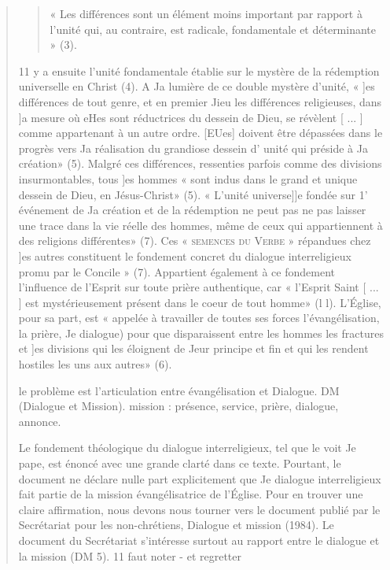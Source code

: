 \begin{quote}
\begin{quote}
« Les différences
sont un élément moins important par rapport à l'unité
qui, au contraire, est radicale, fondamentale et déterminante »
(3). 
\end{quote}
 11 y a ensuite l'unité fondamentale établie sur le mystère
de la rédemption universelle en Christ (4). A Ja lumière de ce
double mystère d'unité, « ]es différences de tout genre, et en
premier Jieu les différences religieuses, dans ]a mesure où eHes
sont réductrices du dessein de Dieu, se révèlent [ ... ] comme
appartenant à un autre ordre. [EUes] doivent être dépassées
dans le progrès vers Ja réalisation du grandiose dessein d' unité
qui préside à Ja création» (5). Malgré ces différences, ressenties
parfois comme des divisions insurmontables, tous ]es
hommes « sont indus dans le grand et unique dessein de Dieu,
en Jésus-Christ» (5). « L'unité universe]]e fondée sur 1' événement
de Ja création et de la rédemption ne peut pas ne pas laisser
une trace dans la vie réelle des hommes, même de ceux qui
appartiennent à des religions différentes» (7). Ces \textsc{« semences
du Verbe »} \label{LogoiSpermatikoi} répandues chez ]es autres constituent le fondement
concret du dialogue interreligieux promu par le Concile » (7).
Appartient également à ce fondement l'influence de l'Esprit
sur toute prière authentique, car « l'Esprit Saint [ ... ] est mystérieusement
présent dans le coeur de tout homme» (l l). L'Église,
pour sa part, est « appelée à travailler de toutes ses forces
l'évangélisation, la prière, Je dialogue) pour que disparaissent
entre les hommes les fractures et ]es divisions qui les éloignent
de Jeur principe et fin et qui les rendent hostiles les uns aux
autres» (6).
\begin{Synthesis}
le problème est l'articulation entre évangélisation et Dialogue. DM (Dialogue et Mission).
mission : présence, service, prière, dialogue, annonce.
\end{Synthesis}
Le fondement théologique du dialogue interreligieux, tel
que le voit Je pape, est énoncé avec une grande clarté dans ce
texte. Pourtant, le document ne déclare nulle part explicitement
que Je dialogue interreligieux fait partie de la mission
évangélisatrice de l'Église.  
Pour en trouver une claire affirmation,
nous devons nous tourner vers le document publié par
le Secrétariat pour les non-chrétiens, Dialogue et mission
(1984). Le document du Secrétariat s'intéresse surtout au rapport
entre le dialogue et la mission (DM 5). 11 faut noter - et regretter

\end{quote}
